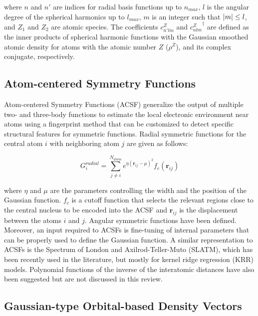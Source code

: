 \noindent where $n$ and $n'$ are indices for radial basis functions up to $n_{max}$, $l$ is 
the angular degree of the spherical harmonics up to $l_{max}$, $m$ is an integer such that 
$\abs{m} \leq l$, and $Z_{1}$ and $Z_{2}$ are atomic species. The coefficients $c^{Z}_{n'lm}$ and 
${c^{Z}_{nlm}}^{\dagger}$ are defined as the inner products of spherical harmonic functions with 
the Gaussian smoothed atomic density for atoms with the atomic number $Z$ ($\rho^Z$), and its complex conjugate, 
respectively.\cite{de2016}

\subsection{Atom-centered Symmetry Functions}

Atom-centered Symmetry Functions (ACSF) generalize the output of multiple two- and three-body functions 
to estimate the local electronic environment near atoms using a fingerprint method that can be customized 
to detect specific structural features for symmetric functions.\cite{behler2011} Radial symmetric functions 
for the central atom $i$ with neighboring atom $j$ are given as follows:

\begin{equation}
    G^{radial}_{i} = \sum^{N_{atom}}_{j \neq i} e^{\eta (\boldsymbol{r}_{ij} - \mu)^{2}} f_{c}(\boldsymbol{r}_{ij})
\end{equation}

\noindent where $\eta$ and $\mu$ are the parameters controlling the width and the position of 
the Gaussian function. $f_{c}$ is a cutoff function that selects the relevant regions close to 
the central nucleus to be encoded into the ACSF and $\boldsymbol{r}_{ij}$ is the displacement between 
the atoms $i$ and $j$. Angular symmetric functions have been defined.\cite{behler2011} 
Moreover, an input required to ACSFs is fine-tuning of internal parameters that can be properly used 
to define the Gaussian function. A similar representation to ACSFs is the Spectrum of London and 
Axilrod-Teller-Muto (SLATM), which has been recently used in the literature, but mostly for 
kernel ridge regression (KRR) models.\cite{faber2018} Polynomial functions of the inverse of 
the interatomic distances have also been suggested but are not discussed in this review.\cite{musil2021}

\subsection{Gaussian-type Orbital-based Density Vectors}

